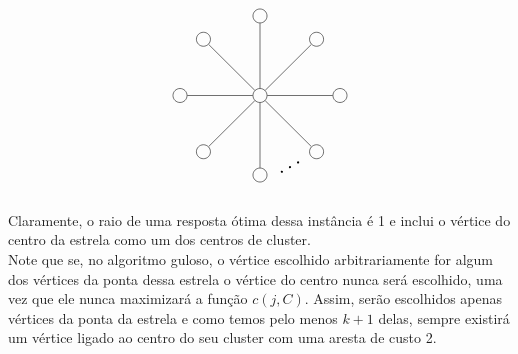 \documentclass[12pt]{article}
\begin{document}
    \[
    \begin{tikzpicture}
        \def\n{8}
        
        \def\r{2cm}
        
        \def\rotationangle{90}
        
        \draw (0,0) node[circle, draw, minimum size=10pt, inner sep=1.5pt] (center) {};
        
        \begin{scope}[rotate=\rotationangle]
          \foreach \i in {1,...,\n} {
            \draw (\i*360/\n:\r) node[circle, draw, minimum size=10pt, inner sep=1.5pt] (\i) {};
          }
        \end{scope}
        
        \foreach \i in {1,...,\n} {
          \draw (center) -- (\i);
        }
        \draw (4) node[shift={(0.75,0.2)}] {\rotatebox{30}{\scalebox{1.5}{$\ldots$}}} (4);
      \end{tikzpicture}
      \] \\
      Claramente, o raio de uma resposta ótima dessa instância é 1 e inclui o vértice do centro da estrela como um dos centros de cluster. \\
      Note que se, no algoritmo guloso, o vértice escolhido arbitrariamente for algum dos vértices da ponta dessa estrela o vértice do centro nunca será escolhido, uma vez que ele nunca maximizará a função $c(j,C)$. Assim, serão escolhidos apenas vértices da ponta da estrela e como temos pelo menos $k+1$ delas, sempre existirá um vértice ligado ao centro do seu cluster com uma aresta de custo 2.
\newpage
\end{document}
